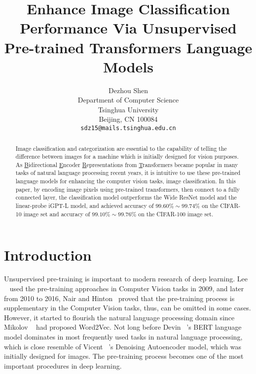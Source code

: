 \documentclass[review]{cvpr}
\begin{document}
\title{Enhance Image Classification Performance Via Unsupervised Pre-trained Transformers Language Models}

\author{Dezhou Shen\\
Department of Computer Science\\
Tsinghua University\\
Beijing, CN 100084\\
{\tt\small sdz15@mails.tsinghua.edu.cn}
}

\maketitle


\begin{abstract}

  Image classification and categorization are essential to the capability of telling the difference between images for a machine
  which is initially designed for vision purposes.
  As \underline{B}idirectional \underline{E}ncoder \underline{R}epresentations from \underline{T}ransformers became popular in many tasks of natural language processing recent years,
  it is intuitive to use these pre-trained language models for enhancing the computer vision tasks, \eg image classification.
  In this paper, by encoding image pixels using pre-trained transformers, then connect to a fully connected layer,
  the classification model outperforms the Wide ResNet model and the linear-probe iGPT-L model,
  and achieved accuracy of $99.60\%\sim99.74\%$ on the CIFAR-10 image set and accuracy of $99.10\%\sim99.76\%$ on the CIFAR-100 image set.

\end{abstract}

\section{Introduction}

  Unsupervised pre-training is important to modern research of deep learning.
  Lee \etal~\cite{lee2009convolutional} used the pre-training approaches
  in Computer Vision tasks in 2009, and later from 2010 to 2016,
  Nair and Hinton~\cite{nair2010rectified} proved that the pre-training process is supplementary in the Computer Vision tasks,
  thus, can be omitted in some cases.
  However, it started to flourish the natural language processing domain since Mikolov \etal~\cite{mikolov2013distributed} had proposed Word2Vec.
  Not long before Devin \etal~\cite{devlin2019bert}'s BERT language model dominates in most frequently used tasks in natural language processing,
  which is close resemble of Vicent \etal~\cite{vincent2008extracting}'s Denoising Autoencoder model, which was initially designed for images.
  The pre-training process becomes one of the most important procedures in deep learning.
\end{document}
